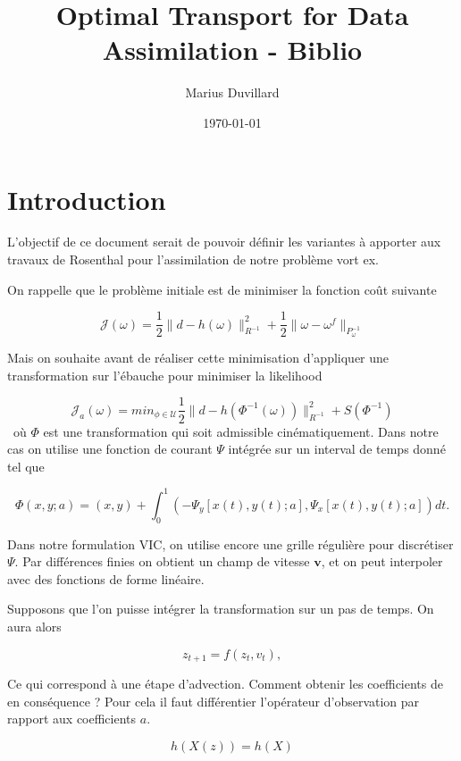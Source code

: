 \documentclass{article}
\newcommand{\norm}[1]{\|#1\|}
\begin{document}
\title{Optimal Transport for Data Assimilation - Biblio}
\author{Marius Duvillard}
\date{\today}
\maketitle

\section{Introduction}
L'objectif de ce document serait de pouvoir définir les variantes à apporter aux travaux de Rosenthal pour l'assimilation de notre problème vort ex.

On rappelle que le problème initiale est de minimiser la fonction coût suivante

\begin{equation*}
    \mathcal J(\omega) = \frac12 \norm{d - h(\omega)}^2_{R^{-1}} + \frac12 \norm{\omega - \omega^f}_{P^{-1}_{\omega}}
\end{equation*}

Mais on souhaite avant de réaliser cette minimisation d'appliquer une transformation sur l'ébauche pour minimiser la likelihood

\begin{equation*}
    \mathcal J_a(\omega) = min_{\phi \in \mathcal U} \frac12 \norm{d - h(\Phi^{-1}(\omega))}^2_{R^{-1}} + S(\Phi^{-1})
\end{equation*}~où $\Phi$ est une transformation qui soit admissible cinématiquement. Dans notre cas on utilise une fonction de courant $\Psi$ intégrée sur un interval de temps donné tel que

\begin{equation}
    \Phi(x,y;a) = (x, y) + \int_0^1 \left(-\Psi_y[x(t),y(t); a], \Psi_x[x(t), y(t); a]\right)dt.
\end{equation}

Dans notre formulation VIC, on utilise encore une grille régulière pour discrétiser $\Psi$. Par différences finies on obtient un champ de vitesse $\bm{v}$, et on peut interpoler avec des fonctions de forme linéaire.

Supposons que l'on puisse intégrer la transformation sur un pas de temps. On aura alors

\begin{equation*}
    z_{t+1} = f(z_{t}, v_{t}),
\end{equation*}

Ce qui correspond à une étape d'advection.
Comment obtenir les coefficients de \Psi en conséquence ?
Pour cela il faut différentier l'opérateur d'observation par rapport aux coefficients $a$.

\begin{equation*}
    h(X(z)) = h (X)
\end{equation*}



\end{document}
